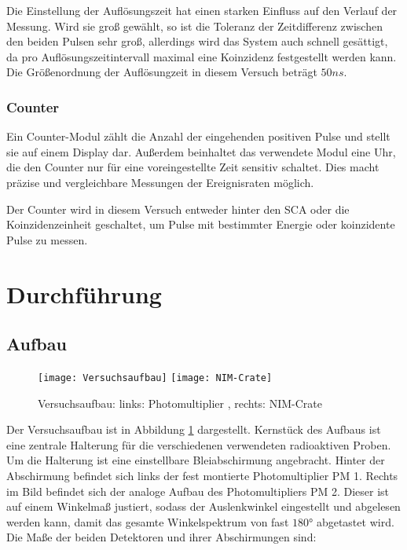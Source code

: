 \documentclass{../Misc/MontavonLaTeX/Montavon}
\newcommand{\halfwidth}{0.48\textwidth}
\begin{document}
Die Einstellung der Auflösungszeit hat einen starken Einfluss auf den Verlauf der Messung. Wird sie groß gewählt, so ist die Toleranz der Zeitdifferenz zwischen den beiden Pulsen sehr groß, allerdings wird das System auch schnell gesättigt, da pro Auflösungszeitintervall maximal eine Koinzidenz festgestellt werden kann. Die Größenordnung der Auflösungzeit in diesem Versuch beträgt $50 \unit{ns}$.

\subsubsection{Counter}
Ein Counter-Modul zählt die Anzahl der eingehenden positiven Pulse und stellt sie auf einem Display dar. Außerdem beinhaltet das verwendete Modul eine Uhr, die den Counter nur für eine voreingestellte Zeit sensitiv schaltet. Dies macht präzise und vergleichbare Messungen der Ereignisraten möglich.

Der Counter wird in diesem Versuch entweder hinter den SCA oder die Koinzidenzeinheit geschaltet, um Pulse mit bestimmter Energie oder koinzidente Pulse zu messen. 

\section{Durchführung}

\subsection{Aufbau}

\begin{figure}[htbp]
\centering
\texttt{[image: Versuchsaufbau]}
\texttt{[image: NIM-Crate]}
\caption{Versuchsaufbau: links: Photomultiplier , rechts: NIM-Crate}
\label{fig:Aufbau}
\end{figure}

Der Versuchsaufbau ist in Abbildung \ref{fig:Aufbau} dargestellt. Kernstück des Aufbaus ist eine zentrale Halterung für die verschiedenen verwendeten radioaktiven Proben. Um die Halterung ist eine einstellbare Bleiabschirmung angebracht. Hinter der Abschirmung befindet sich links der fest montierte Photomultiplier PM 1. Rechts im Bild befindet sich der analoge Aufbau des Photomultipliers PM 2. Dieser ist auf einem Winkelmaß justiert, sodass der Auslenkwinkel eingestellt und abgelesen werden kann, damit das gesamte Winkelspektrum von fast $180 \unit{\degree}$ abgetastet wird. Die Maße der beiden Detektoren und ihrer Abschirmungen sind:
\end{document}
